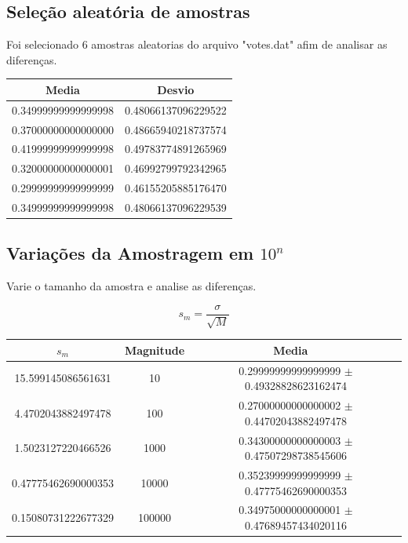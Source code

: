 \documentclass[a4paper, 12pt]{article}
\begin{document}
\subsection{Seleção aleatória de amostras}

Foi selecionado 6 amostras aleatorias do arquivo "votes.dat" afim de analisar as diferenças.

\begin{table}[H]
	\centering
	\begin{tabular}{c | c}
	Media	& Desvio	\\ \hline
	0.34999999999999998      	&  0.48066137096229522\\
	0.37000000000000000      	&  0.48665940218737574\\
	0.41999999999999998      	&  0.49783774891265969\\
	0.32000000000000001      	&  0.46992799792342965\\
	0.29999999999999999      	&  0.46155205885176470\\
	0.34999999999999998      	&  0.48066137096229539\\	
	\end{tabular}
\end{table}

\subsection{Variações da Amostragem em $10^n$}

Varie o tamanho da amostra e analise as diferenças.

\begin{equation*}
	s_m = \frac{\sigma}{\sqrt{M}}
\end{equation*}

\begin{table}[H]
\centering
\begin{tabular}{ c | c | c }
	$s_m$ & Magnitude &  Media \  \\ \hline
	15.599145086561631       &           10   &   0.29999999999999999      $ \pm$  0.49328828623162474       \\ \hline
	4.4702043882497478       &          100   &   0.27000000000000002      $ \pm$   0.44702043882497478       \\ \hline
	1.5023127220466526       &         1000   &   0.34300000000000003      $ \pm$  0.47507298738545606       \\ \hline
	0.47775462690000353       &        10000   &   0.35239999999999999      $ \pm$ 0.47775462690000353       \\ \hline
	0.15080731222677329       &       100000   &   0.34975000000000001      $ \pm$  0.47689457434020116       \\ 

\end{tabular}
\end{table} 
\end{document}
